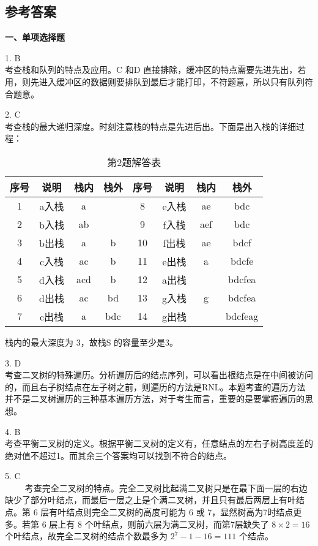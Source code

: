 \subsection{参考答案}
\textbf{一、单项选择题}

1. B \\
考查栈和队列的特点及应用。C 和D 直接排除，缓冲区的特点需要先进先出，若用，则先进入缓冲区的数据则要排队到最后才能打印，不符题意，所以只有队列符合题意。

2. C \\
考查栈的最大递归深度。时刻注意栈的特点是先进后出。下面是出入栈的详细过程：
\begin{table}[ht]
\centering
\caption{第2题解答表}\label{tab_CSN09_5}
\begin{tabular}{|c|c|c|c|c|c|c|c|}
\hline
序号 & 说明 & 栈内 & 栈外 & 序号 & 说明 & 栈内 & 栈外 \\
\hline
1 & a入栈 & a & & 8 & e入栈 & ae & bdc \\
\hline
2 & b入栈 & ab & & 9 & f入栈 & aef & bdc \\
\hline
3 & b出栈 & a & b & 10 & f出栈 & ae & bdcf \\
\hline
4 & c入栈 & ac & b & 11 & e出栈 & a & bdcfe \\
\hline
5 & d入栈 & acd & b & 12 & a出栈 & & bdcfea \\
\hline
6 & d出栈 & ac & bd & 13 & g入栈 & g & bdcfea \\
\hline
7 & c出栈 & a & bdc & 14 & g出栈 & & bdcfeag \\
\hline
\end{tabular}
\end{table}
栈内的最大深度为 3，故栈S 的容量至少是3。

3. D \\
考查二叉树的特殊遍历。分析遍历后的结点序列，可以看出根结点是在中间被访问的，而且右子树结点在左子树之前，则遍历的方法是RNL。本题考查的遍历方法并不是二叉树遍历的三种基本遍历方法，对于考生而言，重要的是要掌握遍历的思想。

4. B \\
考查平衡二叉树的定义。根据平衡二叉树的定义有，任意结点的左右子树高度差的绝对值不超过1。而其余三个答案均可以找到不符合的结点。

5. C \\
$\qquad$ 考查完全二叉树的特点。完全二叉树比起满二叉树只是在最下面一层的右边缺少了部分叶结点，而最后一层之上是个满二叉树，并且只有最后两层上有叶结点。第 $6$ 层有叶结点则完全二叉树的高度可能为 $6$ 或 $7$，显然树高为7时结点更多。若第 $6$ 层上有 $8$ 个叶结点，则前六层为满二叉树，而第7层缺失了 $8\times2=16$ 个叶结点，故完全二叉树的结点个数最多为 $2^7-1-16=111$ 个结点。

